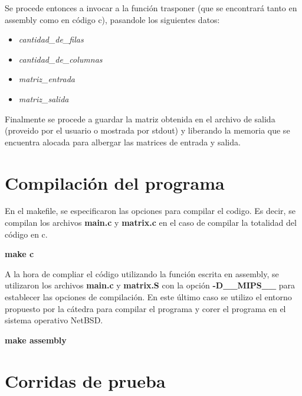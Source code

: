 \documentclass[11pt,a4paper]{article}
\begin{document}
Se procede entonces a invocar a la funci\'on trasponer (que se encontrar\'a tanto en assembly como en c\'odigo c), pasandole los siguientes datos:

\begin{itemize}
\item \textit{cantidad\_de\_filas}
\item \textit{cantidad\_de\_columnas}
\item \textit{matriz\_entrada}
\item \textit{matriz\_salida}
\end{itemize}

Finalmente se procede a guardar la matriz obtenida en el archivo de salida (proveido por el usuario o mostrada por stdout) y liberando la memoria que se encuentra alocada para albergar las matrices de entrada y salida.


\section{Compilación del programa}

En el makefile, se especificaron las opciones para compilar el codigo. Es decir, se compilan los archivos \textbf{main.c} y \textbf{matrix.c} en el caso de compilar la totalidad del c\'odigo en c. 

\begin{center}
\textbf{make c}
\end{center}

A la hora de compliar el c\'odigo utilizando la funci\'on escrita en assembly, se utilizaron los archivos \textbf{main.c} y \textbf{matrix.S} con la opci\'on \textbf{-D\_\_MIPS\_\_} para establecer las opciones de compilaci\'on. En este \'ultimo caso se utilizo el entorno propuesto por la c\'atedra para compilar el programa y corer el programa en el sistema operativo NetBSD.

\begin{center}
\textbf{make assembly}
\end{center}

\section{Corridas de prueba}
\end{document}
